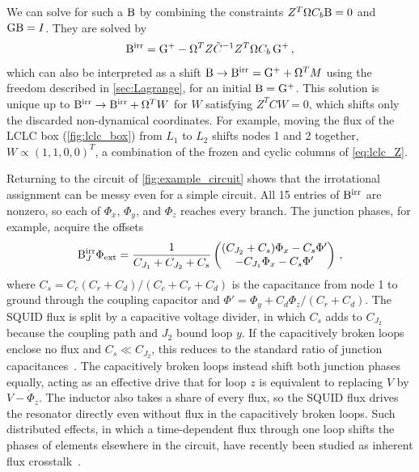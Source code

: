 We can solve for such a $\mathrm{B}$ by combining the constraints $Z^T\Omega C_b \mathrm{B} = 0$ and $\mathrm{G}\mathrm{B}=I$.
They are solved by
\begin{align}
    \mathrm{B}^{\rm irr} = \mathrm{G}^{+} - \Omega^TZ\tilde{C}^{-1}Z^T\Omega C_b\, \mathrm{G}^{+} \, ,
    \label{eq:irrotational_sol}
\end{align}
which can also be interpreted as a shift $\mathrm{B}\to\mathrm{B}^{\rm irr}=\mathrm{G}^{+}+\Omega^TM$ using the freedom described in \cref{sec:Lagrange}, for an initial $\mathrm{B}=\mathrm{G}^{+}$.
This solution is unique up to $\mathrm{B}^{\rm irr} \to \mathrm{B}^{\rm irr}+\Omega^TW$ for $W$ satisfying $Z^TCW=0$, which shifts only the discarded non-dynamical coordinates.
For example, moving the flux of the LCLC box (\cref{fig:lclc_box}) from $L_1$ to $L_2$ shifts nodes 1 and 2 together, $W\propto(1,1,0,0)^T$, a combination of the frozen and cyclic columns of \cref{eq:lclc_Z}.

Returning to the circuit of \cref{fig:example_circuit} shows that the irrotational assignment can be messy even for a simple circuit.
All 15 entries of $\mathrm{B}^{\rm irr}$ are nonzero, so each of $\Phi_x$, $\Phi_y$, and $\Phi_z$ reaches every branch.
The junction phases, for example, acquire the offsets
\begin{align*}
    \mathrm{B}^{\rm irr}_J\Phi_{\rm ext}=\frac{1}{C_{J_1}+C_{J_2}+C_s}\begin{pmatrix}(C_{J_2}+C_s)\Phi_x-C_s\Phi'\\-C_{J_1}\Phi_x-C_s\Phi'\end{pmatrix}\,,
\end{align*}
where $C_s=C_c(C_r+C_d)/(C_c+C_r+C_d)$ is the capacitance from node 1 to ground through the coupling capacitor and $\Phi'=\Phi_y+C_d\Phi_z/(C_r+C_d)$.
The SQUID flux is split by a capacitive voltage divider, in which $C_s$ adds to $C_{J_2}$ because the coupling path and $J_2$ bound loop $y$.
If the capacitively broken loops enclose no flux and $C_s\ll C_{J_2}$, this reduces to the standard ratio of junction capacitances~\cite{YouKoch2019}.
The capacitively broken loops instead shift both junction phases equally, acting as an effective drive that for loop $z$ is equivalent to replacing $V$ by $V-\dot\Phi_z$.
The inductor also takes a share of every flux, so the SQUID flux drives the resonator directly even without flux in the capacitively broken loops.
Such distributed effects, in which a time-dependent flux through one loop shifts the phases of elements elsewhere in the circuit, have recently been studied as inherent flux crosstalk~\cite{BurkardGulacsi2026}.



